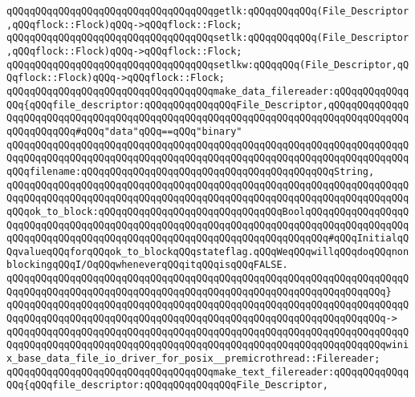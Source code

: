 \newline
\verb|qQQqqQQqqQQqqQQqqQQqqQQqqQQqqQQqqQQqgetlk:qQQqqQQqqQQq(File_Descriptor,qQQqflock::Flock)qQQq->qQQqflock::Flock;|\newline
\verb|qQQqqQQqqQQqqQQqqQQqqQQqqQQqqQQqqQQqsetlk:qQQqqQQqqQQq(File_Descriptor,qQQqflock::Flock)qQQq->qQQqflock::Flock;|\newline
\verb|qQQqqQQqqQQqqQQqqQQqqQQqqQQqqQQqqQQqsetlkw:qQQqqQQq(File_Descriptor,qQQqflock::Flock)qQQq->qQQqflock::Flock;|\newline
\newline
\newline
\verb|qQQqqQQqqQQqqQQqqQQqqQQqqQQqqQQqqQQqmake_data_filereader:qQQqqQQqqQQqqQQq{qQQqfile_descriptor:qQQqqQQqqQQqqQQqFile_Descriptor,qQQqqQQqqQQqqQQqqQQqqQQqqQQqqQQqqQQqqQQqqQQqqQQqqQQqqQQqqQQqqQQqqQQqqQQqqQQqqQQqqQQqqQQqqQQqqQQq#qQQq"data"qQQq==qQQq"binary"|\newline
\verb|qQQqqQQqqQQqqQQqqQQqqQQqqQQqqQQqqQQqqQQqqQQqqQQqqQQqqQQqqQQqqQQqqQQqqQQqqQQqqQQqqQQqqQQqqQQqqQQqqQQqqQQqqQQqqQQqqQQqqQQqqQQqqQQqqQQqqQQqqQQqqQQqfilename:qQQqqQQqqQQqqQQqqQQqqQQqqQQqqQQqqQQqqQQqqQQqString,|\newline
\verb|qQQqqQQqqQQqqQQqqQQqqQQqqQQqqQQqqQQqqQQqqQQqqQQqqQQqqQQqqQQqqQQqqQQqqQQqqQQqqQQqqQQqqQQqqQQqqQQqqQQqqQQqqQQqqQQqqQQqqQQqqQQqqQQqqQQqqQQqqQQqqQQqok_to_block:qQQqqQQqqQQqqQQqqQQqqQQqqQQqqQQqBoolqQQqqQQqqQQqqQQqqQQqqQQqqQQqqQQqqQQqqQQqqQQqqQQqqQQqqQQqqQQqqQQqqQQqqQQqqQQqqQQqqQQqqQQqqQQqqQQqqQQqqQQqqQQqqQQqqQQqqQQqqQQqqQQqqQQqqQQqqQQqqQQq#qQQqInitialqQQqvalueqQQqforqQQqok_to_blockqQQqstateflag.qQQqWeqQQqwillqQQqdoqQQqnonblockingqQQqI/OqQQqwheneverqQQqitqQQqisqQQqFALSE.|\newline
\verb|qQQqqQQqqQQqqQQqqQQqqQQqqQQqqQQqqQQqqQQqqQQqqQQqqQQqqQQqqQQqqQQqqQQqqQQqqQQqqQQqqQQqqQQqqQQqqQQqqQQqqQQqqQQqqQQqqQQqqQQqqQQqqQQqqQQqqQQq}|\newline
\verb|qQQqqQQqqQQqqQQqqQQqqQQqqQQqqQQqqQQqqQQqqQQqqQQqqQQqqQQqqQQqqQQqqQQqqQQqqQQqqQQqqQQqqQQqqQQqqQQqqQQqqQQqqQQqqQQqqQQqqQQqqQQqqQQqqQQqqQQq->|\newline
\verb|qQQqqQQqqQQqqQQqqQQqqQQqqQQqqQQqqQQqqQQqqQQqqQQqqQQqqQQqqQQqqQQqqQQqqQQqqQQqqQQqqQQqqQQqqQQqqQQqqQQqqQQqqQQqqQQqqQQqqQQqqQQqqQQqqQQqqQQqwinix_base_data_file_io_driver_for_posix__premicrothread::Filereader;|\newline
\newline
\verb|qQQqqQQqqQQqqQQqqQQqqQQqqQQqqQQqqQQqmake_text_filereader:qQQqqQQqqQQqqQQq{qQQqfile_descriptor:qQQqqQQqqQQqqQQqFile_Descriptor,|\newline
